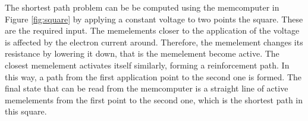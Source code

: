 The shortest path problem can be be computed using the memcomputer in Figure \ref{fig:square} by applying a constant voltage to two points the square.
These are the required input.
The memelements closer to the application of the voltage is affected by the electron current around.
Therefore, the memelement changes its resistance by lowering it down, that is the memelement become active.
The closest memelement activates itself similarly, forming a reinforcement path.
In this way, a path from the first application point to the second one is formed.
The final state that can be read from the memcomputer is a straight line of active memelements from the first point to the second one, which is the shortest path in this square.